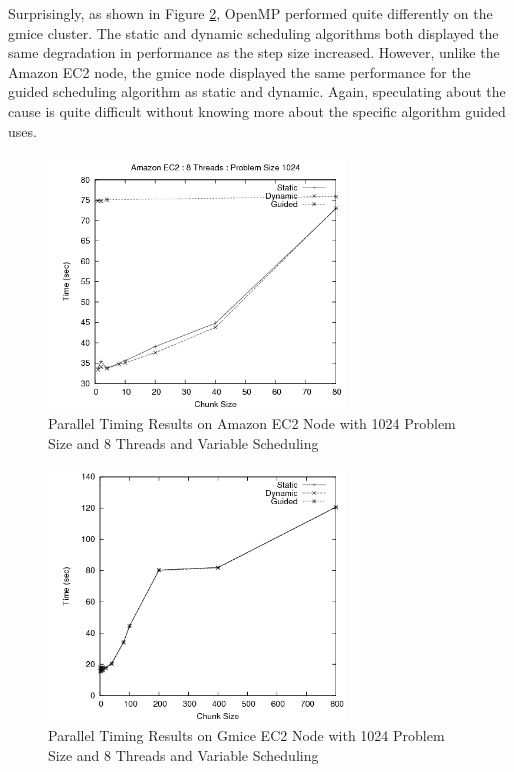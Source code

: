 \documentclass{article}
\begin{document}
Surprisingly, as shown in Figure \ref{gmice_chunk}, OpenMP performed quite differently on the gmice cluster. The static and dynamic scheduling algorithms both displayed the same degradation in performance as the step size increased. However, unlike the Amazon EC2 node, the gmice node displayed the same performance for the guided scheduling algorithm as static and dynamic. Again, speculating about the cause is quite difficult without knowing more about the specific algorithm guided uses.

\begin{figure}
\centering
\includegraphics[width=0.7\textwidth]{../data/amazon_chunk.png}
\caption{Parallel Timing Results on Amazon EC2 Node with 1024 Problem Size and 8 Threads and Variable Scheduling}
\label{amazon_chunk}
\end{figure}

\begin{figure}
\centering
\includegraphics[width=0.7\textwidth]{../data/gmice_block.png}
\caption{Parallel Timing Results on Gmice EC2 Node with 1024 Problem Size and 8 Threads and Variable Scheduling}
\label{gmice_chunk}
\end{figure}
\end{document}
